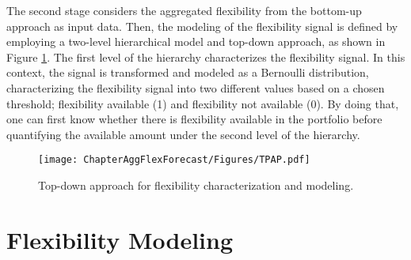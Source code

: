 The second stage considers the aggregated flexibility from the bottom-up approach as input data. Then, the modeling of the flexibility signal is defined by employing a two-level hierarchical model and top-down approach, as shown in Figure \ref{fig:top_down}. The first level of the hierarchy characterizes the flexibility signal. In this context, the signal is transformed and modeled as a Bernoulli distribution, characterizing the flexibility signal into two different values based on a chosen threshold; flexibility available (1) and flexibility not available (0). By doing that, one can first know whether there is flexibility available in the portfolio before quantifying the available amount under the second level of the hierarchy. 

\begin{figure}[htbp]
\centerline{\texttt{[image: ChapterAggFlexForecast/Figures/TPAP.pdf]}}
\caption{Top-down approach for flexibility characterization and modeling.}
\label{fig:top_down}
\end{figure}

\section{Flexibility Modeling} \label{Sect:FlexModeling}
